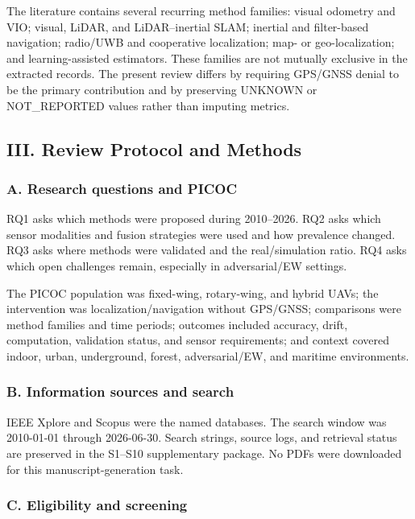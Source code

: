 \documentclass[
  journal,
  10pt]{IEEEtran}
\begin{document}
The literature contains several recurring method families: visual
odometry and VIO; visual, LiDAR, and LiDAR--inertial SLAM; inertial and
filter-based navigation; radio/UWB and cooperative localization; map- or
geo-localization; and learning-assisted estimators. These families are
not mutually exclusive in the extracted records. The present review
differs by requiring GPS/GNSS denial to be the primary contribution and
by preserving UNKNOWN or NOT\_REPORTED values rather than imputing
metrics.

\subsection{III. Review Protocol and
Methods}\label{iii-review-protocol-and-methods}

\subsubsection{A. Research questions and
PICOC}\label{a-research-questions-and-picoc}

RQ1 asks which methods were proposed during 2010--2026. RQ2 asks which
sensor modalities and fusion strategies were used and how prevalence
changed. RQ3 asks where methods were validated and the real/simulation
ratio. RQ4 asks which open challenges remain, especially in
adversarial/EW settings.

The PICOC population was fixed-wing, rotary-wing, and hybrid UAVs; the
intervention was localization/navigation without GPS/GNSS; comparisons
were method families and time periods; outcomes included accuracy,
drift, computation, validation status, and sensor requirements; and
context covered indoor, urban, underground, forest, adversarial/EW, and
maritime environments.

\subsubsection{B. Information sources and
search}\label{b-information-sources-and-search}

IEEE Xplore and Scopus were the named databases. The search window was
2010-01-01 through 2026-06-30. Search strings, source logs, and
retrieval status are preserved in the S1--S10 supplementary package. No
PDFs were downloaded for this manuscript-generation task.

\subsubsection{C. Eligibility and
screening}\label{c-eligibility-and-screening}
\end{document}
